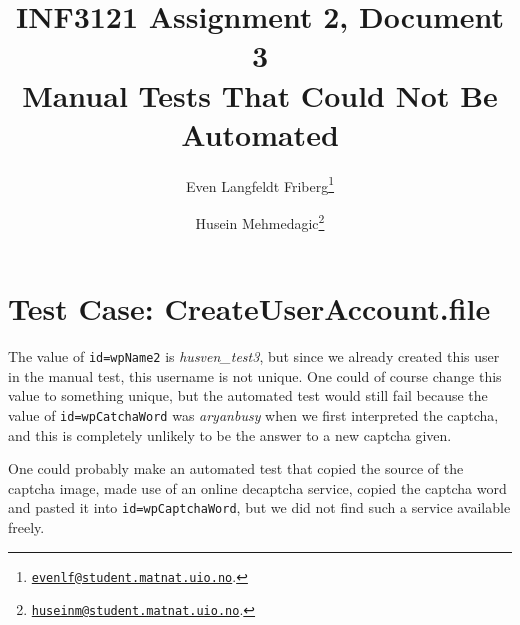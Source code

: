 \documentclass[a4paper,10pt]{article}
\title{INF3121 Assignment 2, Document 3 \\ Manual Tests That Could Not Be Automated}
\author{
Even Langfeldt Friberg\footnote{\href{mailto:evenlf@student.matnat.uio.no}{\nolinkurl{evenlf@student.matnat.uio.no}}.}
\and Husein Mehmedagic\footnote{\href{mailto:huseinm@student.matnat.uio.no}{\nolinkurl{huseinm@student.matnat.uio.no}}.}
}
\begin{document}
\maketitle

\section{Test Case: CreateUserAccount.file}
The value of \texttt{id=wpName2} is \textit{husven\_test3}, but since we already created this user in the manual test, this username is not unique. One could of course 
change this value to something unique, but the automated test would still fail because the value of \texttt{id=wpCatchaWord} was \textit{aryanbusy} when we first 
interpreted the captcha, and this is completely unlikely to be the answer to a new captcha given.

One could probably make an automated test that copied the source of the captcha image, made use of an online decaptcha service, copied the captcha word 
and pasted it into \texttt{id=wpCaptchaWord}, but we did not find such a service available freely.
\end{document}
